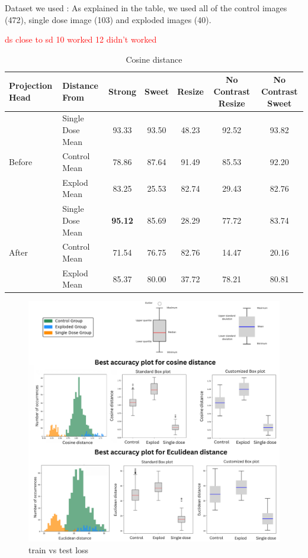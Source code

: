 Dataset we used : As explained in the table, we used all of the control images (472),
single dose image (103) and exploded images (40).

\textcolor{red}{ds close to sd 10 worked 12 didn't worked}



\begin{table}[H]
  \centering
  \begin{tabular}{@{}llccccc@{}}
  \toprule
  Projection Head & Distance From      & Strong & Sweet & Resize & No Contrast Resize & No Contrast Sweet \\ \midrule
                  & Single Dose Mean   & 93.33      & 93.50     & 48.23      & 92.52                  & 93.82                 \\
  Before          & Control Mean       & 78.86      & 87.64     & 91.49      & 85.53                  & 92.20                 \\
                  & Explod Mean        & 83.25      & 25.53     & 82.74      & 29.43                  & 82.76                 \\ \midrule
                  & Single Dose Mean   & \textbf{95.12}      & 85.69     & 28.29      & 77.72                  & 83.74                 \\
  After           & Control Mean       & 71.54      & 76.75     & 82.76      & 14.47                  & 20.16                 \\
                  & Explod Mean        & 85.37      & 80.00     & 37.72      & 78.21                  & 80.81                 \\ \bottomrule
  \end{tabular}
  \caption{Cosine distance}
  \label{tab:table_label}
\end{table}

\begin{figure}[H]
  \centering
  \includegraphics[scale=0.5]{figures/allbox.pdf} 
  \caption{train vs test loss}
  \label{fig:unloss}
\end{figure}

